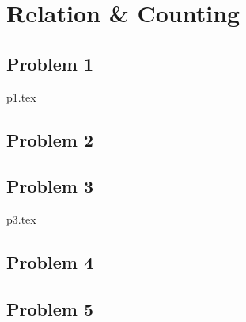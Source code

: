 \documentclass[a4paper]{article}
\begin{document}


    \section{Relation \& Counting}

    \subsection{Problem 1}
    {p1.tex}

    \subsection{Problem 2}

    \subsection{Problem 3}
    {p3.tex}

    \subsection{Problem 4}

    \subsection{Problem 5}
\end{document}
